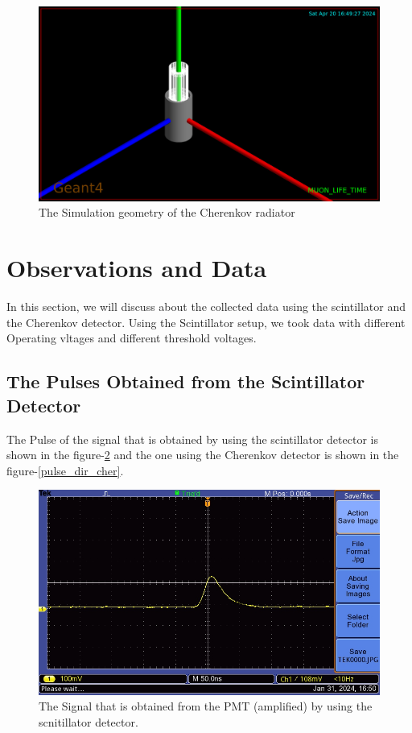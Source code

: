 \documentclass{article}
\begin{document}
\begin{multicols}{2}
\begin{figure}[H]
    \centering
    \includegraphics[width = \columnwidth]{Images/cher_sim_1.jpeg}
    \caption{The Simulation geometry of the Cherenkov radiator\cite{agostinelli2003geant4}}
    \label{chergeo}
\end{figure}
\section{\label{observations}Observations and Data}




In this section, we will discuss about the collected data using the scintillator and the Cherenkov detector. Using the Scintillator setup, we took data with different Operating vltages and different threshold voltages.


\subsection{The Pulses Obtained from the Scintillator Detector}

The Pulse of the signal that is obtained by using the scintillator detector is shown in the figure-\ref{pulse_dir_scint} and the one using the Cherenkov detector is shown in the figure-\ref{pulse_dir_cher}.
\begin{figure}[H]
    \centering
    \includegraphics[width = \columnwidth]{Images/Pulse_amp.JPG}
    \caption{The Signal that is obtained from the PMT (amplified) by using the scnitillator detector.}
    \label{pulse_dir_scint}
\end{figure}



\end{multicols}
\end{document}
